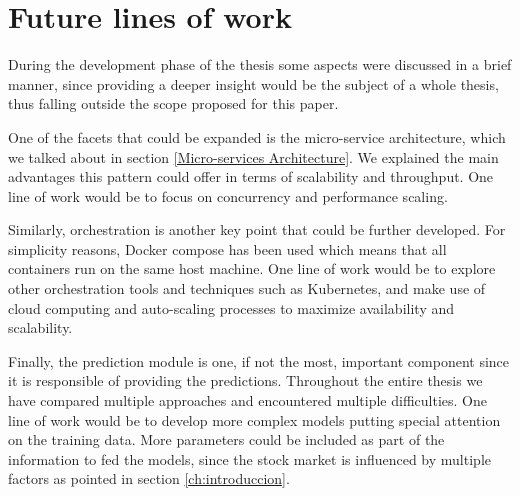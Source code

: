 \chapter{Future lines of work}
\label{fu:future}

During the development phase of the thesis some aspects were discussed in a brief manner, since providing a deeper insight would be the subject of a whole thesis, thus falling outside the scope proposed for this paper.

One of the facets that could be expanded is the micro-service architecture, which we talked about in section \ref{Micro-services Architecture}. We explained the main advantages this pattern could offer in terms of scalability and throughput. One line of work would be to focus on concurrency and performance scaling.

Similarly, orchestration is another key point that could be further developed. For simplicity reasons, Docker compose has been used which means that all containers run on the same host machine. One line of work would be to explore other orchestration tools and techniques such as Kubernetes, and make use of cloud computing and auto-scaling processes to maximize availability and scalability.

Finally, the prediction module is one, if not the most, important component since it is responsible of providing the predictions. Throughout the entire thesis we have compared multiple approaches and encountered multiple difficulties. One line of work would be to develop more complex models putting special attention on the training data. More parameters could be included as part of the information to fed the models, since the stock market is influenced by multiple factors as pointed in section \ref{ch:introduccion}. 

